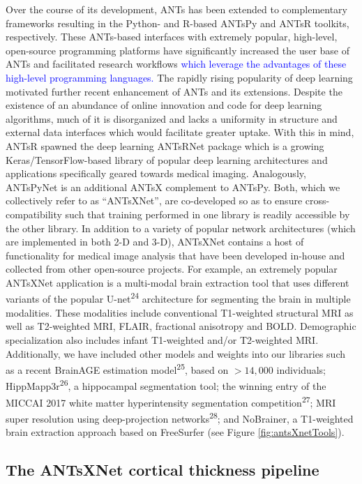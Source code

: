 \documentclass[12pt,]{article}
\begin{document}


Over the course of its development, ANTs has been extended to
complementary frameworks resulting in the Python- and R-based ANTsPy and
ANTsR toolkits, respectively. These ANTs-based interfaces with extremely
popular, high-level, open-source programming platforms have
significantly increased the user base of ANTs and facilitated research
workflows \textcolor{blue}{which leverage the
advantages of these high-level programming languages.} The rapidly
rising popularity of deep learning motivated further recent enhancement
of ANTs and its extensions. Despite the existence of an abundance of
online innovation and code for deep learning algorithms, much of it is
disorganized and lacks a uniformity in structure and external data
interfaces which would facilitate greater uptake. With this in mind,
ANTsR spawned the deep learning ANTsRNet package which is a growing
Keras/TensorFlow-based library of popular deep learning architectures
and applications specifically geared towards medical imaging.
Analogously, ANTsPyNet is an additional ANTsX complement to ANTsPy.
Both, which we collectively refer to as ``ANTsXNet'', are co-developed
so as to ensure cross-compatibility such that training performed in one
library is readily accessible by the other library. In addition to a
variety of popular network architectures (which are implemented in both
2-D and 3-D), ANTsXNet contains a host of functionality for medical
image analysis that have been developed in-house and collected from
other open-source projects. For example, an extremely popular ANTsXNet
application is a multi-modal brain extraction tool that uses different
variants of the popular U-net\textsuperscript{24} architecture for
segmenting the brain in multiple modalities. These modalities include
conventional T1-weighted structural MRI as well as T2-weighted MRI,
FLAIR, fractional anisotropy and BOLD. Demographic specialization also
includes infant T1-weighted and/or T2-weighted MRI. Additionally, we
have included other models and weights into our libraries such as a
recent BrainAGE estimation model\textsuperscript{25}, based on
\(>14,000\) individuals; HippMapp3r\textsuperscript{26}, a hippocampal
segmentation tool; the winning entry of the MICCAI 2017 white matter
hyperintensity segmentation competition\textsuperscript{27}; MRI super
resolution using deep-projection networks\textsuperscript{28}; and
NoBrainer, a T1-weighted brain extraction approach based on FreeSurfer
(see Figure \ref{fig:antsXnetTools}).

\hypertarget{the-antsxnet-cortical-thickness-pipeline}{%
\subsection*{The ANTsXNet cortical thickness
pipeline}\label{the-antsxnet-cortical-thickness-pipeline}}
\end{document}

